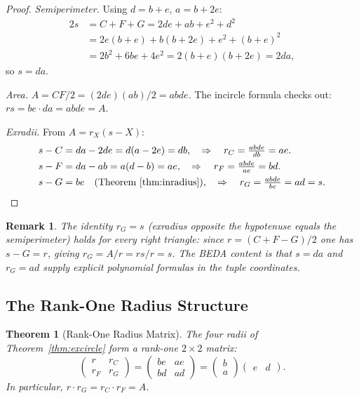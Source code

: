 \documentclass[12pt]{article}
\newtheorem{theorem}{Theorem}
\newtheorem{remark}{Remark}
\begin{document}
\begin{proof}
\emph{Semiperimeter.}  Using $d=b+e$, $a=b+2e$:
\begin{align*}
  2s &= C+F+G = 2de + ab + e^2+d^2 \\
     &= 2e(b+e)+b(b+2e)+e^2+(b+e)^2 \\
     &= 2b^2+6be+4e^2 = 2(b+e)(b+2e) = 2da,
\end{align*}
so $s = da$.

\emph{Area.}  $A = CF/2 = (2de)(ab)/2 = abde$.
The incircle formula checks out: $rs = be\cdot da = abde = A$.

\emph{Exradii.}  From $A = r_X(s-X)$:
\begin{align*}
  s-C &= da-2de = d(a-2e) = db, \quad \Rightarrow\quad r_C = \tfrac{abde}{db} = ae.\\
  s-F &= da-ab = a(d-b) = ae,  \quad \Rightarrow\quad r_F = \tfrac{abde}{ae} = bd.\\
  s-G &= be \quad\text{(Theorem~\ref{thm:inradius})},
            \quad \Rightarrow\quad r_G = \tfrac{abde}{be} = ad = s.\qedhere
\end{align*}
\end{proof}

\begin{remark}
The identity $r_G = s$ (exradius opposite the hypotenuse equals the semiperimeter)
holds for \emph{every} right triangle: since $r = (C+F-G)/2$ one has $s - G = r$,
giving $r_G = A/r = rs/r = s$.  The BEDA content is that $s = da$ and $r_G = ad$
supply explicit polynomial formulas in the tuple coordinates.
\end{remark}

\subsection{The Rank-One Radius Structure}

\begin{theorem}[Rank-One Radius Matrix]\label{thm:rank1}
The four radii of Theorem~\ref{thm:excircle} form a rank-one $2\times 2$ matrix:
\[
  \begin{pmatrix} r & r_C \\ r_F & r_G \end{pmatrix}
  =
  \begin{pmatrix} be & ae \\ bd & ad \end{pmatrix}
  =
  \begin{pmatrix} b \\ a \end{pmatrix}
  \begin{pmatrix} e & d \end{pmatrix}.
\]
In particular, $r\cdot r_G = r_C \cdot r_F = A$.
\end{theorem}
\end{document}
